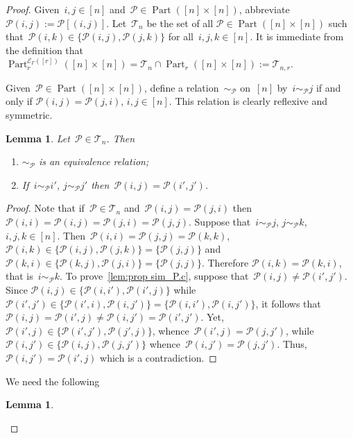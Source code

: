 \documentclass[12pt, reqno]{amsart}
\newtheorem{lemma}[theorem]{Lemma}
\theoremstyle{definition}
\numberwithin{equation}{section}
\newenvironment{enumalph}{\begin{enumerate}[label={\rm(\alph*)},leftmargin=*]}{\end{enumerate}}
\DeclareMathOperator{\Part}{Part}
\begin{document}
\begin{proof}
Given~$i,j\in[n]$ and~$\mathcal P\in\Part([n]\times[n])$,
abbreviate~$\mathcal P(i,j):=\mathcal P[(i,j)]$.
Let~$\mathscr T_n$ be the set of all $\mathcal P\in \Part([n]\times[n])$
such that~$\mathcal P(i,k)\in\{\mathcal P(i,j),\mathcal P(j,k)\}$ for all~$i,j,k\in[n]$. 
It is immediate from the definition that~$\Part_r^{\mathcal E_\Gamma([r])}([n]\times[n])
=\mathscr T_n\cap \Part_r([n]\times[n]):=\mathscr T_{n,r}$.


Given~$\mathcal P\in\Part([n]\times[n])$, define a relation~$\sim_{\mathcal P}$
on~$[n]$ by~$i\sim_{\mathcal P}j$ if and only if $\mathcal P(i,j)=\mathcal P(j,i)$,
$i,j\in[n]$. This relation is clearly reflexive and symmetric.
\begin{lemma}\label{lem:prop sim_P}
Let~$\mathcal P\in\mathscr T_n$. Then
\begin{enumalph}
\item\label{lem:prop sim_P.a} $\sim_{\mathcal P}$ is an equivalence relation;
\item\label{lem:prop sim_P.c} If~$i\sim_{\mathcal P}i'$,
$j\sim_{\mathcal P}j'$ then~$\mathcal P(i,j)=\mathcal P(i',j')$.
\end{enumalph}
\end{lemma}
\begin{proof}
Note that if~$\mathcal P\in\mathscr T_n$ and~$\mathcal P(i,j)=\mathcal P(j,i)$
then~$\mathcal P(i,i)=\mathcal P(i,j)=\mathcal P(j,i)=\mathcal P(j,j)$.
Suppose that~$i\sim_{\mathcal P}j$, $j\sim_{\mathcal P}k$, $i,j,k\in[n]$. Then~$\mathcal P(i,i)=\mathcal P(j,j)=\mathcal P(k,k)$,
$\mathcal P(i,k)\in\{\mathcal P(i,j),\mathcal P(j,k)\}=\{\mathcal P(j,j)\}$
and~$\mathcal P(k,i)\in\{\mathcal P(k,j),\mathcal P(j,i)\}=\{\mathcal P(j,j)\}$.
Therefore $\mathcal P(i,k)=\mathcal P(k,i)$, that is~$i\sim_{\mathcal P}k$.
To prove~\ref{lem:prop sim_P.c}, 
suppose that~$\mathcal P(i,j)\not=\mathcal P(i',j')$. Since
$\mathcal P(i,j)\in\{\mathcal P(i,i'),\mathcal P(i',j)\}$ while
$\mathcal P(i',j')\in\{\mathcal P(i',i),\mathcal P(i,j')\}=
\{\mathcal P(i,i'),\mathcal P(i,j')\}$, it follows that~$\mathcal P(i,j)=
\mathcal P(i',j)\not=\mathcal P(i,j')=\mathcal P(i',j')$. Yet,
$\mathcal P(i',j)\in\{\mathcal P(i',j'),\mathcal P(j',j)\}$, whence~$\mathcal P(i',j)=\mathcal P(j,j')$, while~$\mathcal P(i,j')\in\{\mathcal P(i,j),\mathcal P(j,j')\}$ whence~$\mathcal P(i,j')=\mathcal P(j,j')$. Thus, $\mathcal P(i,j')=\mathcal P(i',j)$ which is a contradiction.
\end{proof}
We need the following
\begin{lemma}\label{lem:surj map part}

\end{lemma}
\end{proof}
\end{document}
